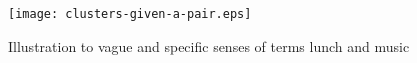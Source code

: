 
\begin{figure}[th]
 \centerline{
 \texttt{[image: clusters-given-a-pair.eps]}}
\caption{Illustration to vague and specific senses of terms lunch and music} \label{fig:clusters-given-a-pair}
\end{figure}
